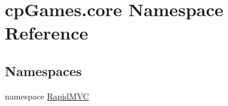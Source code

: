 \hypertarget{namespacecp_games_1_1core}{}\section{cp\+Games.\+core Namespace Reference}
\label{namespacecp_games_1_1core}
\subsection*{Namespaces}
\begin{DoxyCompactItemize}
\item 
namespace \mbox{\hyperlink{namespacecp_games_1_1core_1_1_rapid_m_v_c}{Rapid\+M\+VC}}
\end{DoxyCompactItemize}
